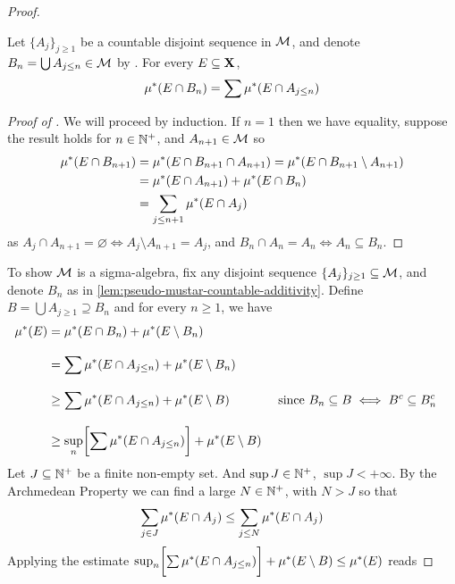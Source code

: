\documentclass[../../main.tex]{subfiles}
\begin{document}
\begin{proof}
\begin{corollary}
    \end{corollary}
    \begin{lemma}\label{lem:pseudo-mustar-countable-additivity}
        Let $\{A_j\}_{j\geq 1}$ be a countable disjoint sequence in $\mathcal{M}$, and denote $B_n = \bigcup A_{j\leq n}\in\mathcal{M}$ by . For every $E\subseteq {\mathbf{X}}$, 
        \[
            \mu^*(E\cap B_n) = \sum\mu^*(E\cap A_{j\leq n})
        \]
    \end{lemma}
    \begin{proof}[Proof of ]
        We will proceed by induction. If $n=1$ then we have equality, suppose the result holds for $n\in\mathbb{N}^+$, and $A_{n+1}\in\mathcal{M}$ so
        \begin{align*}
            \mu^*(E\cap B_{n+1}) &= \mu^*(E\cap B_{n+1}\cap A_{n+1}) = \mu^*(E\cap B_{n+1}\setminus A_{n+1})\\
            &= \mu^*(E\cap A_{n+1}) + \mu^*(E\cap B_n)\\
            &= \sum_{j\leq n+1}\mu^*(E\cap A_j)
        \end{align*}
        as $A_j\cap A_{n+1} = \varnothing\iff A_j\setminus A_{n+1}=A_j$, and $B_n\cap A_n = A_n\iff A_n\subseteq B_n$.
    \end{proof}
    To show $\mathcal{M}$ is a sigma-algebra, fix any disjoint sequence $\{A_j\}_{j\geq 1}\subseteq\mathcal{M}$, and denote $B_n$ as in \cref{lem:pseudo-mustar-countable-additivity}. Define $B = \bigcup A_{j\geq 1}\supseteq B_n$ and for every $n\geq 1$, we have 
    \begin{align*}
        \mu^*(E) &= \mu^*(E\cap B_n) + \mu^*(E\setminus B_n)\\[2ex]
        &= \sum \mu^*(E\cap A_{j\leq n}) + \mu^*(E\setminus B_n)\\[2ex]
        &\geq \sum \mu^*(E\cap A_{j\leq n}) + \mu^*(E\setminus B) && \text{ since }B_n\subseteq B\iff B^c\subseteq B_n^c\\[2ex]
        &\geq \sup_n \biggl[ \sum \mu^*(E\cap A_{j\leq n}) \biggr] + \mu^*(E\setminus B)
    \end{align*}
    Let $J\subseteq \mathbb{N}^+$ be a finite non-empty set. And $\sup J \in\mathbb{N}^+$, $\sup J < +\infty$. By the Archmedean Property we can find a large $N\in\mathbb{N}^+$, with $N>J$ so that 
    \[
        \sum_{j\in J}\mu^*(E\cap A_j) \leq \sum_{j\leq N}\mu^*(E\cap A_j)
    \]
    Applying the estimate $\sup_n \biggl[ \sum \mu^*(E\cap A_{j\leq n}) \biggr] + \mu^*(E\setminus B) \leq \mu^*(E)$ reads

\end{proof}
\end{document}
